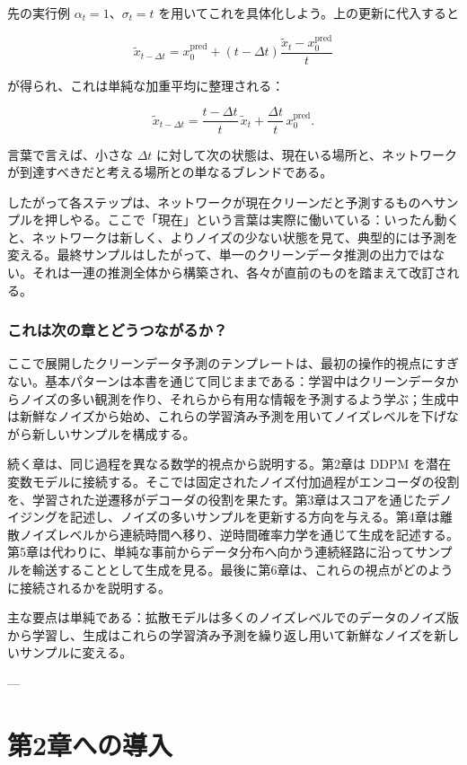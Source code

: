 先の実行例 $\alpha_t = 1$、$\sigma_t = t$ を用いてこれを具体化しよう。上の更新に代入すると

\[
\tilde{x}_{t-\Delta t}
= x_0^{\mathrm{pred}} + (t-\Delta t)\frac{\tilde{x}_t - x_0^{\mathrm{pred}}}{t}
\]


が得られ、これは単純な加重平均に整理される：

\[
\tilde{x}_{t-\Delta t}
= \frac{t-\Delta t}{t}\,\tilde{x}_t + \frac{\Delta t}{t}\,x_0^{\mathrm{pred}}.
\]


言葉で言えば、小さな $\Delta t$ に対して次の状態は、現在いる場所と、ネットワークが到達すべきだと考える場所との単なるブレンドである。

したがって各ステップは、ネットワークが現在クリーンだと予測するものへサンプルを押しやる。ここで「現在」という言葉は実際に働いている：いったん動くと、ネットワークは新しく、よりノイズの少ない状態を見て、典型的には予測を変える。最終サンプルはしたがって、単一のクリーンデータ推測の出力ではない。それは一連の推測全体から構築され、各々が直前のものを踏まえて改訂される。

\subsubsection*{これは次の章とどうつながるか？}


ここで展開したクリーンデータ予測のテンプレートは、最初の操作的視点にすぎない。基本パターンは本書を通じて同じままである：学習中はクリーンデータからノイズの多い観測を作り、それらから有用な情報を予測するよう学ぶ；生成中は新鮮なノイズから始め、これらの学習済み予測を用いてノイズレベルを下げながら新しいサンプルを構成する。

続く章は、同じ過程を異なる数学的視点から説明する。第2章は DDPM を潜在変数モデルに接続する。そこでは固定されたノイズ付加過程がエンコーダの役割を、学習された逆遷移がデコーダの役割を果たす。第3章はスコアを通じたデノイジングを記述し、ノイズの多いサンプルを更新する方向を与える。第4章は離散ノイズレベルから連続時間へ移り、逆時間確率力学を通じて生成を記述する。第5章は代わりに、単純な事前からデータ分布へ向かう連続経路に沿ってサンプルを輸送することとして生成を見る。最後に第6章は、これらの視点がどのように接続されるかを説明する。

主な要点は単純である：拡散モデルは多くのノイズレベルでのデータのノイズ版から学習し、生成はこれらの学習済み予測を繰り返し用いて新鮮なノイズを新しいサンプルに変える。

---

\section*{第2章への導入}


